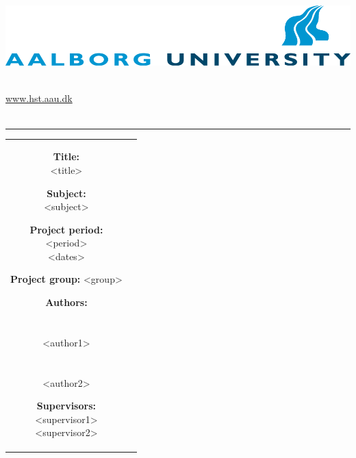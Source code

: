	\begin{adjustwidth*}{-1.6cm}{-1cm}
		\begin{nopagebreak}
			{\samepage 
				\parbox{14.5cm}{
					\begin{flushright}
						\includegraphics{img/aauLogoEn.png}\\
					\end{flushright}
					\vspace{0.2cm}
				  \\
				  { \href{http://www.hst.aau.dk/}{www.hst.aau.dk}}\\
				  \vspace{-0.8cm}\\
					\hrule
					\vspace{0.2cm}
				}
				
				\begin{tabular}{cc}
					\parbox{6.3cm}{
						\hspace{2cm}
						\begin{description}
							\item {\textbf{Title:}}\\
								<title>
							\item {\textbf{Subject:}}\\
								<subject>\\
							\item {\textbf{Project period:}}\\
							  <period>\\
							  <dates>\\
							\item {\textbf{Project group:}}
							  <group>
							\item {\textbf{Authors:}}\\\\
								\underline{\phantom{-----------------------------------------}}\\
								<author1>\\\\
								\underline{\phantom{-----------------------------------------}}\\
								<author2>\\
							\item {\textbf{Supervisors:}}\\
								<supervisor1>\\
								<supervisor2>\\
						\end{description}
						
}
\end{tabular}}
\end{nopagebreak}
\end{adjustwidth*}
